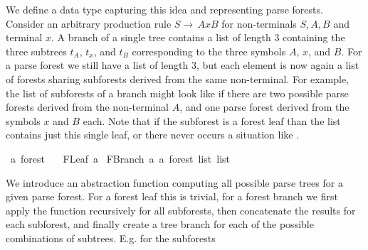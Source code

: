 \begin{isabellebody}
\begin{isamarkuptext}
We define a data type  capturing this idea and representing parse forests. Consider an arbitrary production rule
$S \rightarrow \, AxB$ for non-terminals $S, A, B$ and terminal $x$. A branch of a single tree
contains a list of length $3$ containing the three subtrees $t_A$, $t_x$, and $t_B$ corresponding to
the three symbols $A$, $x$, and $B$. For a parse forest we still have a list of length $3$, but each element is now
again a list of forests sharing subforests derived from the same non-terminal. For example, the list of subforests of a branch
might look like  if there are two possible parse forests derived from
the non-terminal $A$, and one parse forest derived from the symbols $x$ and $B$ each. Note that if the subforest is a forest leaf than the list contains just this
single leaf, or there never occurs a situation like .%
\end{isamarkuptext}\isamarkuptrue%
\isamarkupfalse%
\ {\isacharprime}{\kern0pt}a\ forest\ {\isacharequal}{\kern0pt}\isanewline
\ \ FLeaf\ {\isacharprime}{\kern0pt}a\isanewline
{\isacharbar}{\kern0pt}\ FBranch\ {\isacharprime}{\kern0pt}a\ {\isachardoublequoteopen}{\isacharprime}{\kern0pt}a\ forest\ list\ list{\isachardoublequoteclose}%
\begin{isamarkuptext}%
We introduce an abstraction function  computing all possible parse trees for a given parse forest.
For a forest leaf this is trivial, for a forest branch we first apply the function
 recursively for all subforests, then concatenate the results for each subforest, and finally create a tree branch
for each of the possible combinations of subtrees. E.g. for the subforests

\end{isamarkuptext}
\end{isabellebody}
